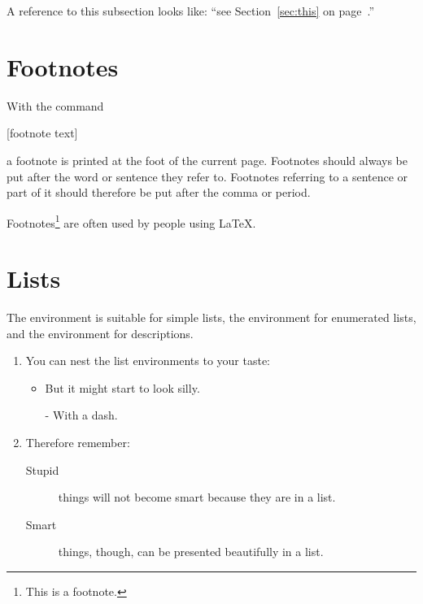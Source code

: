 \begin{example}[examplewidth=0.4\textwidth]
A reference to this subsection%
\label{sec:this} looks like:
\enquote{see Section~\ref{sec:this}
on page~\pageref{sec:this}.}
\end{example}

\section{Footnotes}
With the command
\begin{lscommand}
  [footnote text]
\end{lscommand}
a footnote is printed at the foot of the current page.  Footnotes should always
be put after the word or sentence they refer to. Footnotes referring to a
sentence or part of it should therefore be put after the comma or period.

\begin{example}
Footnotes\footnote{This is
  a footnote.} are often used
by people using \LaTeX.
\end{example}

\section{Lists}

The  environment is suitable for simple lists, the
 environment for enumerated lists, and the
 environment for descriptions.

\begin{example}
\begin{enumerate}
\item You can nest the list
environments to your taste:
\begin{itemize}
\item But it might start to
look silly.
\item[-] With a dash.
\end{itemize}
\item Therefore remember:
\begin{description}
\item[Stupid] things will not
become smart because they are
in a list.
\item[Smart] things, though,
can be presented beautifully
in a list.
\end{description}
\end{enumerate}
\end{example}

